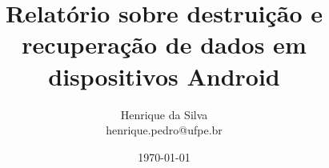 \documentclass[12pt,twoside, a4paper]{article}
\begin{document}
\title{Relatório sobre destruição e recuperação de dados em dispositivos Android}
\author{Henrique da Silva \\ henrique.pedro@ufpe.br}
\date{\today}

\maketitle
{}
\tableofcontents
\newpage













% 

% 
\end{document}
